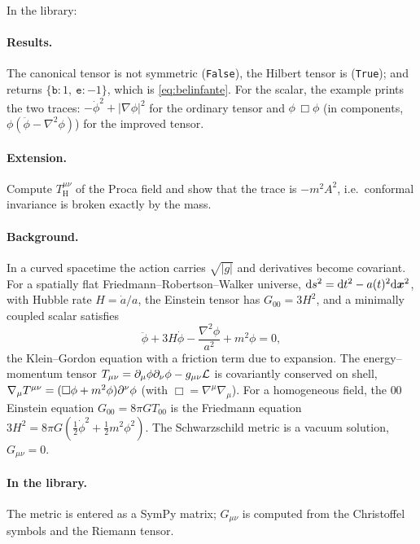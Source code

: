 In the library:


\paragraph{Results.} The canonical tensor is not symmetric (\texttt{False}), the Hilbert tensor is (\texttt{True}); and  returns $\{\texttt{b}:1,\ \texttt{e}:-1\}$, which is \cref{eq:belinfante}. For the scalar, the example prints the two traces: $-\dot\phi^2+|\nabla\phi|^2$ for the ordinary tensor and $\phi\,\Box\phi$ (in components, $\phi(\ddot\phi-\nabla^2\phi)$) for the improved tensor.

\paragraph{Extension.} Compute $T_{\mathrm H}^{\mu\nu}$ of the Proca field and show that the trace is $-m^2A^2$, i.e.\ conformal invariance is broken exactly by the mass.


\paragraph{Background.} In a curved spacetime the action carries $\sqrt{|g|}$ and derivatives become covariant. For a spatially flat Friedmann--Robertson--Walker universe, $\mathrm{d} s^2=\mathrm{d} t^2-a(t)^2\mathrm{d}\bm{x}^2$, with Hubble rate $H=\dot a/a$, the Einstein tensor has $G_{00}=3H^2$, and a minimally coupled scalar satisfies
\begin{equation}
\ddot\phi+3H\dot\phi-\frac{\nabla^2\phi}{a^2}+m^2\phi=0,
\end{equation}
the Klein--Gordon equation with a friction term due to expansion. The energy--momentum tensor $T_{\mu\nu}=\partial_\mu\phi\partial_\nu\phi-g_{\mu\nu}\mathcal L$ is covariantly conserved on shell, $\nabla_\mu T^{\mu\nu}=(\square\phi+m^2\phi)\partial^\nu\phi$ (with $\Box=\nabla^\mu\nabla_\mu$). For a homogeneous field, the $00$ Einstein equation $G_{00}=8\pi GT_{00}$ is the Friedmann equation $3H^2=8\pi G(\tfrac12\dot\phi^2+\tfrac12m^2\phi^2)$. The Schwarzschild metric is a vacuum solution, $G_{\mu\nu}=0$.

\paragraph{In the library.} The metric is entered as a SymPy matrix; $G_{\mu\nu}$ is computed from the Christoffel symbols and the Riemann tensor.


